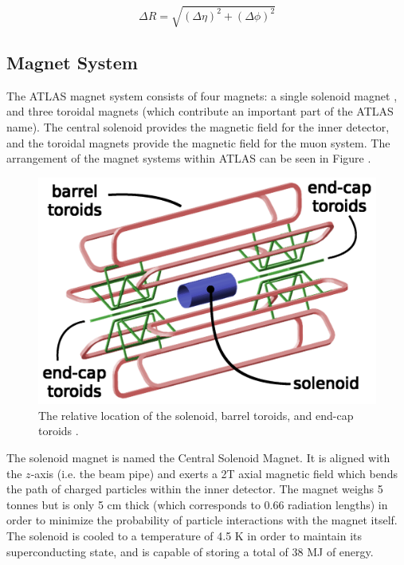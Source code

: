 \documentclass[12pt,a4paper,epsf,portrait,times,epsfig]{report}
\begin{document}
		\begin{equation}
			\Delta R = \sqrt{ (\Delta\eta)^{2} + (\Delta\phi)^{2} }
		\end{equation}


		\subsection{Magnet System}\label{Section:Magnets}

		The ATLAS magnet system consists of four magnets: a single solenoid magnet \cite{ATLASSolenoidMagnet}, and three toroidal magnets \cite{ATLASBarrelToroid, ATLASEndcapToroid} (which contribute an important part of the ATLAS name). The central solenoid provides the magnetic field for the inner detector, and the toroidal magnets provide the magnetic field	for the muon system. The arrangement of the magnet systems within ATLAS can be seen in Figure . \par

		\begin{figure}
			\centering
			\includegraphics[scale=0.15]{Magnet_Layout.png}
			\caption{The relative location of the solenoid, barrel toroids, and end-cap toroids \cite{ATLASToroids}. }
			\label{Fig:CernMagneticLayout}
		\end{figure}

		The solenoid magnet is named the Central Solenoid Magnet. It is aligned with the $z$-axis (i.e. the beam pipe) and exerts a 2T axial magnetic field which bends the path of charged particles within the inner detector. The magnet weighs 5 tonnes but is only 5 cm thick (which corresponds to 0.66 radiation lengths) in order to minimize the probability of particle interactions with the magnet itself. The solenoid is cooled to a temperature of 4.5 K in order to maintain its superconducting state, and is capable of storing a total of 38 MJ of energy. \par
		
\end{document}

